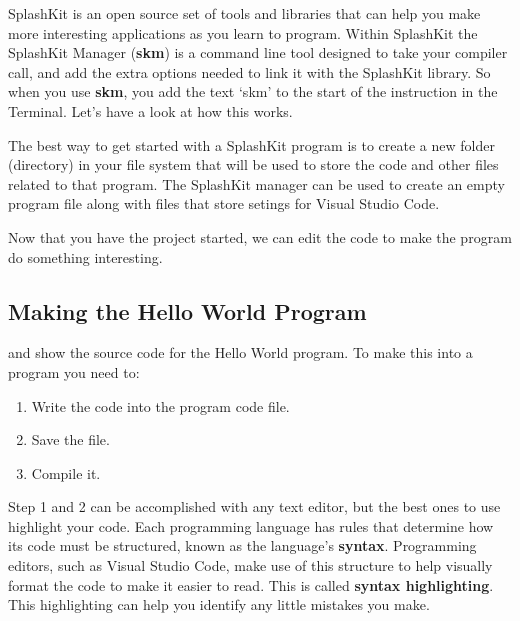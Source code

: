 SplashKit is an open source set of tools and libraries that can help you make more interesting applications as you learn to program. Within SplashKit the SplashKit Manager (\textbf{skm}) is a command line tool designed to take your compiler call, and add the extra options needed to link it with the SplashKit library. So when you use \textbf{skm}, you add the text `skm' to the start of the instruction in the Terminal. Let's have a look at how this works.

The best way to get started with a SplashKit program is to create a new folder (directory) in your file system that will be used to store the code and other files related to that program. The SplashKit manager can be used to create an empty program file along with files that store setings for Visual Studio Code.



Now that you have the project started, we can edit the code to make the program do something interesting.

\clearpage
\subsection{Making the Hello World Program} %
\label{sub:compiling_code}

 and  show the source code for the Hello World program. To make this into a program you need to:

\begin{enumerate}
  \item Write the code into the program code file.
  \item Save the file.
  \item Compile it.
\end{enumerate}

Step 1 and 2 can be accomplished with any text editor, but the best ones to use highlight your code. Each programming language has rules that determine how its code must be structured, known as the language's \textbf{syntax}. Programming editors, such as Visual Studio Code, make use of this structure to help visually format the code to make it easier to read. This is called \textbf{syntax highlighting}. This highlighting can help you identify any little mistakes you make. 

